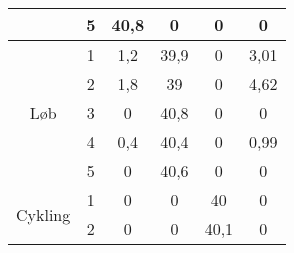 \begin{table}[H]
\begin{tabular}{cccccc}
		& 5             & 40,8                                                                                                & 0                                                                                                & 0      & 0                                                                                               \\ \hline
		\multirow{5}{*}{Løb}                                                      & 1                                                                                                          & 1,2 & 39,9                                                                                             & 0     & 3,01                                                                                                \\
		& 2                                                                                           & 1,8  & 39                                                                                            & 0         & 4,62                                                                                            \\
		& 3                                                                                              & 0    & 40,8                                                                                            & 0      & 0                                                                                               \\
		& 4                                                                                                      & 0,4  & 40,4                                                                                            & 0     & 0,99                                                                                                \\
		& 5                                                                                                    & 0     & 40,6                                                                                           & 0         & 0   \\ \hline
		\multirow{5}{*}{Cykling}     & 1     & 0        & 0     & 40    & 0      \\
		& 2             & 0                                                                                                & 0                                                                                                & 40,1       & 0                                                                                              \\

\end{tabular}
\end{table}

